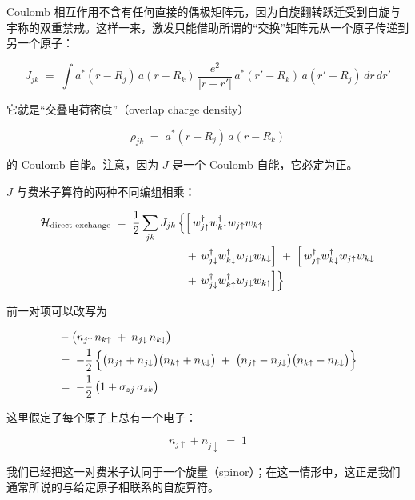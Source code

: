 Coulomb 相互作用不含有任何直接的偶极矩阵元，因为自旋翻转跃迁受到自旋与宇称的双重禁戒。这样一来，激发只能借助所谓的“交换”矩阵元从一个原子传递到另一个原子：

\begin{equation*}
J_{jk} \;=\; \int a^{*}(r-R_j)\, a(r-R_k)\, \frac{e^{2}}{|r-r'|}\, a^{*}(r'-R_k)\, a(r'-R_j)\, dr\, dr'
\end{equation*}

它就是“交叠电荷密度”（overlap charge density）

\begin{equation*}
\rho_{jk} \;=\; a^{*}(r-R_j)\, a(r-R_k)
\end{equation*}

的 Coulomb 自能。注意，因为 $J$ 是一个 Coulomb 自能，它必定为正。

$J$ 与费米子算符的两种不同编组相乘：

\begin{align*}
\mathcal{H}_{\text{direct exchange}} \;=\; \frac{1}{2} \sum_{jk} J_{jk}\, \Bigl\{ &\Bigl[\, w^{\dagger}_{j\uparrow} w^{\dagger}_{k\uparrow} w_{j\uparrow} w_{k\uparrow} \\
&+\, w^{\dagger}_{j\downarrow} w^{\dagger}_{k\downarrow} w_{j\downarrow} w_{k\downarrow} \Bigr] \;+\; \Bigl[\, w^{\dagger}_{j\uparrow} w^{\dagger}_{k\downarrow} w_{j\uparrow} w_{k\downarrow} \\
&+\, w^{\dagger}_{j\downarrow} w^{\dagger}_{k\uparrow} w_{j\downarrow} w_{k\uparrow} \Bigr] \Bigr\}
\end{align*}

前一对项可以改写为

\begin{align*}
&-\bigl(n_{j\uparrow}\, n_{k\uparrow} \;+\; n_{j\downarrow}\, n_{k\downarrow}\bigr) \\
&=\; -\frac{1}{2}\,\Bigl\{ \bigl(n_{j\uparrow} + n_{j\downarrow}\bigr)\bigl(n_{k\uparrow} + n_{k\downarrow}\bigr) \;+\; \bigl(n_{j\uparrow} - n_{j\downarrow}\bigr)\bigl(n_{k\uparrow} - n_{k\downarrow}\bigr) \Bigr\} \\
&=\; -\frac{1}{2}\,\bigl(1 + \sigma_{zj}\, \sigma_{zk}\bigr)
\end{align*}

这里假定了每个原子上总有一个电子：

\begin{equation*}
n_{j\uparrow} + n_{j\downarrow} \;=\; 1
\end{equation*}

我们已经把这一对费米子认同于一个旋量（spinor）；在这一情形中，这正是我们通常所说的与给定原子相联系的自旋算符。

